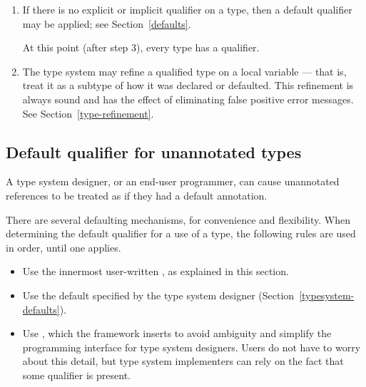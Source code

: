 \begin{enumerate}
\item
  If there is no explicit or implicit qualifier on a type, then a default
  qualifier may be applied; see Section~\ref{defaults}.

  \smallskip

  At this point (after step 3), every type has a qualifier.

\item
  The type system may refine a qualified type on a local variable --- that
  is, treat it as a subtype of how it was declared or defaulted.  This
  refinement is always sound and has the effect of eliminating false
  positive error messages.  See Section~\ref{type-refinement}.


\end{enumerate}



\subsection{Default qualifier for unannotated types\label{defaults}}

A type system designer, or an end-user programmer, can cause unannotated
references to be treated as if they had a default annotation.

There are several defaulting mechanisms, for convenience and flexibility.
When determining the default qualifier for a use of a type, the following
rules are used in order, until one applies.
\begin{itemize}
\item
  Use the innermost user-written , as explained in
  this section.
\item
  Use the default specified by the type system designer
  (Section~\ref{typesystem-defaults}).
\item
  Use , which the framework
  inserts to avoid ambiguity and simplify the programming interface for
  type system designers.  Users do not have to worry about this detail,
  but type system implementers can rely on the fact that some
  qualifier is present.
\end{itemize}



